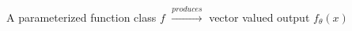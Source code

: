 \documentclass[preview]{standalone}
\begin{document}
A parameterized function class $f$ $\xrightarrow{produces}$ vector valued output $f_\theta(x)$\\
\end{document}

